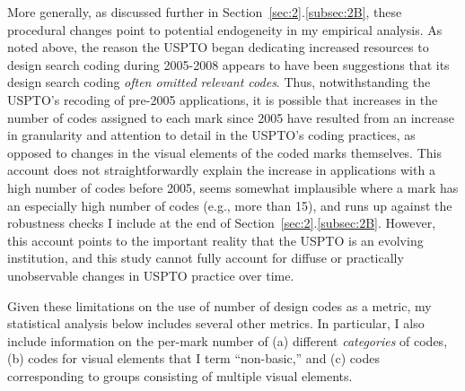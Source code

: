 \documentclass[letterpaper, 11pt, oneside]{article}
\begin{document}
\begin{enumerate}
More generally, as discussed further in Section~\ref{sec:2}.\ref{subsec:2B}, these procedural changes point to potential endogeneity in my empirical analysis. As noted above, the reason the USPTO began dedicating increased resources to design search coding during 2005-2008 appears to have been suggestions that its design search coding \textit{often omitted relevant codes}. Thus, notwithstanding the USPTO's recoding of pre-2005 applications, it is possible that increases in the number of codes assigned to each mark since 2005 have resulted from an increase in granularity and attention to detail in the USPTO's coding practices, as opposed to changes in the visual elements of the coded marks themselves. This account does not straightforwardly explain the increase in applications with a high number of codes before 2005, seems somewhat implausible where a mark has an especially high number of codes (e.g., more than 15), and runs up against the robustness checks I include at the end of Section~\ref{sec:2}.\ref{subsec:2B}. However, this account points to the important reality that the USPTO is an evolving institution, and this study cannot fully account for diffuse or practically unobservable changes in USPTO practice over time.

\end{enumerate}

Given these limitations on the use of number of design codes as a metric, my statistical analysis below includes several other metrics. In particular, I also include information on the per-mark number of (a) different \emph{categories} of codes, (b) codes for visual elements that I term ``non-basic,'' and (c) codes corresponding to groups consisting of multiple visual elements.
\end{document}
